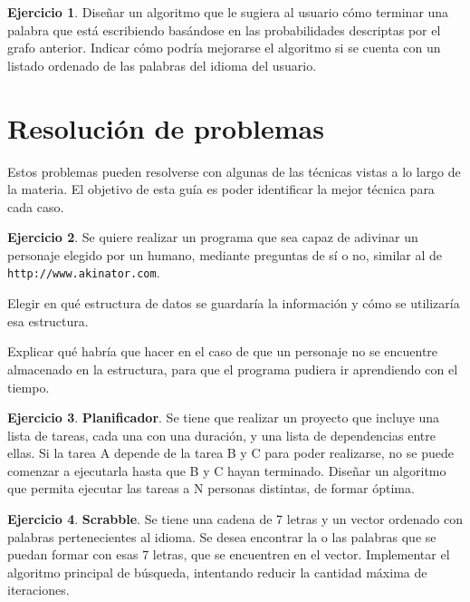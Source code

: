 \documentclass[11pt,a4paper]{article}
\theoremstyle{definition}
\newtheorem{ejercicio}{Ejercicio}[section]
\begin{document}
\begin{ejercicio}
Diseñar un algoritmo que le sugiera al usuario cómo terminar una palabra
que está escribiendo basándose en las probabilidades descriptas por el
grafo anterior.  Indicar cómo podría mejorarse el algoritmo si se cuenta
con un listado ordenado de las palabras del idioma del usuario.
\end{ejercicio}

\newpage
\section{Resolución de problemas}

Estos problemas pueden resolverse con algunas de las técnicas vistas a lo
largo de la materia.  El objetivo de esta guía es poder identificar la
mejor técnica para cada caso.

\begin{ejercicio}
Se quiere realizar un programa que sea capaz de adivinar un personaje
elegido por un humano, mediante preguntas de sí o no, similar al de
\texttt{http://www.akinator.com}.
\begin{partes}
\item Elegir en qué estructura de datos se guardaría la información y cómo se
utilizaría esa estructura.
\item Explicar qué habría que hacer en el caso de que un personaje no se
encuentre almacenado en la estructura, para que el programa pudiera ir
aprendiendo con el tiempo.
\end{partes}
\end{ejercicio}

\begin{ejercicio}
\textbf{Planificador}. Se tiene que realizar un proyecto que incluye una
lista de tareas, cada una con una duración, y una lista de
dependencias entre ellas.  Si la tarea A depende de la tarea B y C
para poder realizarse, no se puede comenzar a ejecutarla hasta que B y
C hayan terminado. Diseñar un algoritmo que permita ejecutar las
tareas a N personas distintas, de formar óptima.
\end{ejercicio}

\begin{ejercicio}
\textbf{Scrabble}. Se tiene una cadena de 7 letras y un vector ordenado con
palabras pertenecientes al idioma.  Se desea encontrar la o las
palabras que se puedan formar con esas 7 letras, que se encuentren en
el vector. Implementar el algoritmo principal de búsqueda, intentando
reducir la cantidad máxima de iteraciones.
\end{ejercicio}
\end{document}
